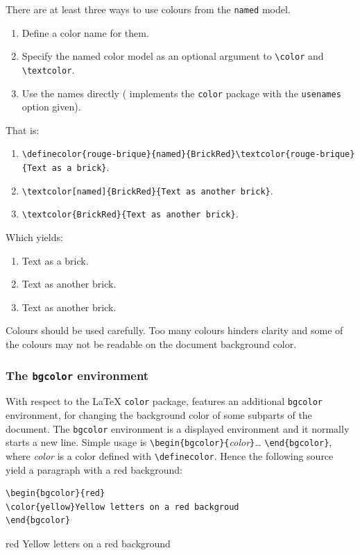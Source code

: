 There are at least three ways to use colours from the \texttt{named}
 model.
\begin{enumerate}
\item Define a color name for them.
\item Specify the named color model as an optional argument to
 \verb+\color+ and \verb+\textcolor+.
\item Use the names directly
(\hevea{} implements the \texttt{color} package with
the \texttt{usenames} option given).
\end{enumerate}
That is:
\begin{enumerate}
\item
\verb+\definecolor{rouge-brique}{named}{BrickRed}\textcolor{rouge-brique}{Text as a brick}+.
\item \verb+\textcolor[named]{BrickRed}{Text as another brick}+.
\item \verb+\textcolor{BrickRed}{Text as another brick}+.
\end{enumerate}
\ifhevea Which yields:
\begin{enumerate}
\item {}
\textcolor{rouge-brique}{Text as a brick}.
\item \textcolor[named]{BrickRed}{Text as another brick}.
\item \textcolor{BrickRed}{Text as another brick}.
\end{enumerate}\fi


Colours should be used carefully. Too many colours
hinders clarity and some of the colours may not be readable on the
document background color.

\subsubsection{The \texttt{bgcolor} environment}
\label{bgcolor}
With respect to the \LaTeX{} \texttt{color} package, \hevea{} features
an additional
\texttt{bgcolor} environment, for changing the background color of some
subparts of the document.
The \texttt{bgcolor} environment is a displayed environment and it
normally starts a new line.
Simple usage is \verb+\begin{bgcolor}{+\textit{color}\verb+}+\ldots{}
\verb+\end{bgcolor}+, where
\textit{color} is a color defined with \verb+\definecolor+.
Hence the following source yield a paragraph with a red background:
\begin{verbatim}
\begin{bgcolor}{red}
\color{yellow}Yellow letters on a red backgroud
\end{bgcolor}
\end{verbatim}
\begin{htmlonly}
\begin{bgcolor}{red}
\color{yellow}Yellow letters on a red background
\end{bgcolor}
\end{htmlonly}

